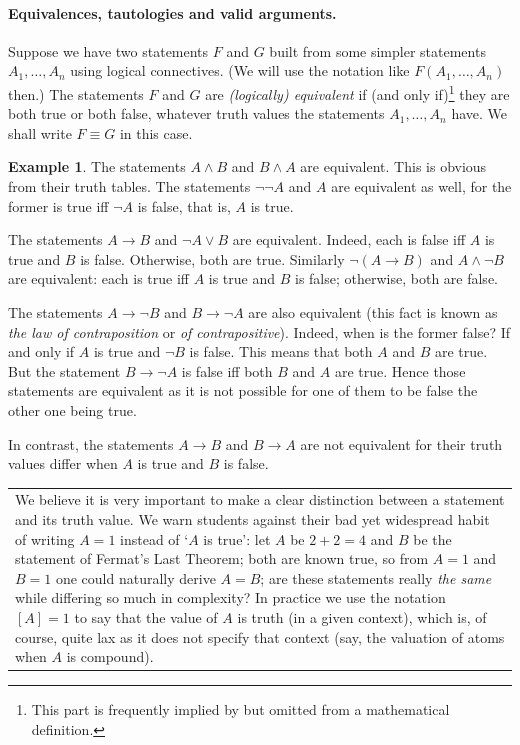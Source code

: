 \documentclass[12pt,notitlepage]{article}
\theoremstyle{plain}
\theoremstyle{definition}
\newtheorem{exm}[thm]{Example}
\theoremstyle{plain}
\newcommand{\1}{\mathbf{1}}
\newcommand{\0}{\mathbf{0}}
\newcommand{\mcomm}[1]{
\medskip\noindent\begin{tabular}{| l}
\parbox{0.99\textwidth}{{\small
#1 }}\end{tabular}
\smallskip}
\begin{document}
\paragraph{Equivalences, tautologies and valid arguments.} Suppose we have two statements $F$ and $G$ built from some simpler statements $A_1,\ldots,A_n$ using logical connectives. (We will use the notation like $F(A_1,\ldots,A_n)$ then.) The statements $F$ and $G$ are \emph{(logically) equivalent} if (and only if)\footnote{This part is frequently implied by but omitted from a mathematical definition.} they are both true or both false, whatever truth values the statements $A_1,\ldots, A_n$ have. We shall write $F \equiv G$ in this case.
\begin{exm}
The statements $A \wedge B$ and $B \wedge A$ are equivalent. This is obvious from their truth tables. The statements $\neg \neg A$ and $A$ are equivalent as well, for the former is true iff $\neg A$ is false, that is, $A$ is true. 

The statements $A \to B$ and $\neg A \vee B$ are equivalent. Indeed, each is false iff $A$ is true and $B$ is false. Otherwise, both are true. Similarly $\neg(A \to B)$ and $A \wedge \neg B$ are equivalent: each is true iff $A$ is true and $B$ is false; otherwise, both are false.

The statements $A \to \neg B$ and $B \to \neg A$ are also equivalent (this fact is known as \emph{the law of contraposition} or \emph{of contrapositive}). Indeed, when is the former false? If and only if $A$ is true and $\neg B$ is false. This means that both $A$ and $B$ are true. But the statement $B \to \neg A$ is false iff both $B$ and $A$ are true. Hence those statements are equivalent as it is not possible for one of them to be false the other one being true.



In contrast, the statements $A \to B$ and $B \to A$ are not equivalent for their truth values differ when $A$ is true and $B$ is false.
\end{exm}
\mcomm{We believe it is very important to make a clear distinction between a statement and its truth value. We warn students against their bad yet widespread habit of writing $A = 1$ instead of `$A$ is true': let $A$ be $2 + 2 = 4$ and $B$ be the statement of Fermat's Last Theorem; both are known true, so from $A = 1$ and $B = 1$ one could naturally derive $A = B$; are these statements really \emph{the same} while differing so much in complexity? In practice we use the notation $[A] = 1$ to say that the value of $A$ is truth (in a given context), which is, of course, quite lax as it does not specify that context (say, the valuation of atoms when $A$ is compound).}
\end{document}

